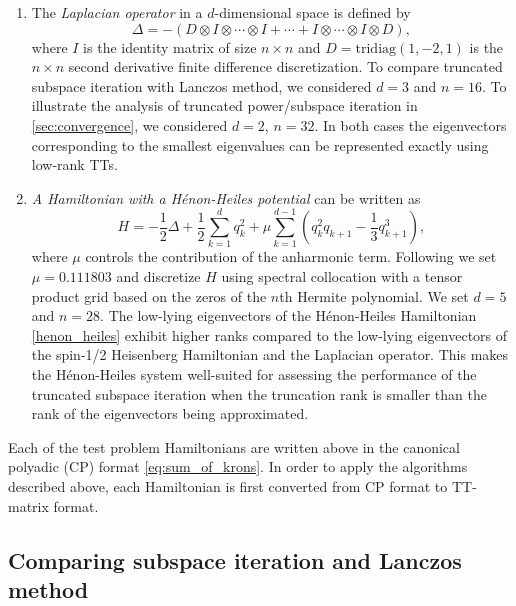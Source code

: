 \documentclass[10pt,preprint]{elsarticle}
\newcommand{\cy}[1]{{{\color{red}{[CY: #1]}}}}
\begin{document}
\begin{enumerate}
\item The \textit{Laplacian operator} in a $d$-dimensional space is defined by
\begin{equation} \label{eq:laplacian-operator}
    \Delta = -\left(D \otimes I \otimes \cdots \otimes I + \cdots + 
             I \otimes \cdots \otimes I \otimes D\right), 
\end{equation}
where $I$ is the identity matrix of size $n \times n$ and $D=\text{tridiag}(1,-2,1)$ is the $n \times n$ second derivative finite difference discretization. To compare truncated subspace iteration with Lanczos method, we considered $d=3$ and $n = 16$. To illustrate the analysis of truncated power/subspace iteration in \cref{sec:convergence}, we considered $d=2$, $n=32$. In both cases the eigenvectors corresponding to the smallest eigenvalues can be represented exactly using low-rank TTs. 
%
\item \textit{A Hamiltonian with a H\'enon-Heiles potential} can be written as
\begin{equation}
    \label{henon_heiles}
    H = -\frac{1}{2} \Delta 
        + \frac{1}{2} \sum_{k=1}^d q_k^2 
        + \mu \sum_{k=1}^{d-1}\left( 
        q_k^2 q_{k+1} - \frac{1}{3} q_{k+1}^3
        \right), 
\end{equation}
where $\mu$ controls the contribution of the anharmonic term. Following \cite{dolgov2014} we set $\mu=0.111803$ and discretize $H$ using spectral collocation with a tensor product grid based on the zeros of the $n$th Hermite polynomial. We set $d=5$ and $n=28$. The low-lying eigenvectors of the H\'enon-Heiles Hamiltonian \eqref{henon_heiles} exhibit higher ranks compared to the low-lying eigenvectors of the spin-1/2 Heisenberg Hamiltonian and the Laplacian operator. This makes the H\'enon-Heiles system well-suited for assessing the performance of the truncated subspace iteration when the truncation rank is smaller than the rank of the eigenvectors being approximated. 

\end{enumerate}

Each of the test problem Hamiltonians are written above in the canonical polyadic (CP) format \eqref{eq:sum_of_krons}. In order to apply the algorithms described above, each Hamiltonian is first converted from CP format to TT-matrix format. 

\subsection{Comparing subspace iteration and Lanczos method} 
\end{document}

